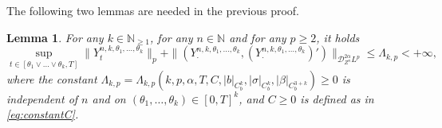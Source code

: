 \documentclass[11pt,a4paper]{article}
\theoremstyle{plain}
\newtheorem{lemma}[defn]{Lemma}
\begin{document}
The following two lemmas are needed in the previous proof. 

\begin{lemma}\label{lemma:aprioriboundsinthesmoothcase}
     For any $k \in \mathbb{N}_{\ge 1}$, for any $n\in \mathbb{N}$ and for any $p \ge 2$, it holds \begin{equation*}
         \sup_{t \in [\theta_1 \vee \ldots \vee \theta_k, T]} \|Y_t^{n,k, \theta_1,\ldots, \theta_k} {\|_p}  +\| (Y_{\cdot}^{n,k, \theta_1, \ldots,\theta_k}, (Y_{\cdot}^{n,k, \theta_1, \ldots, \theta_k})') \|_{\mathcal{D}_{Z^n}^{2 \alpha} L^p} \le \Lambda_{k, p}  < + \infty,
     \end{equation*}
  where the constant $\Lambda_{k, p} = \Lambda_{k, p} (k, p, \alpha, T, C, | b |_{C^k_b}, | \sigma |_{C^k_b}, | \beta |_{C^{3 + k}_b})
  \ge 0$ is independent of $n$ and on $(\theta_1, \dots, \theta_k) \in [0, T]^k$, and $C\ge0$ is defined as in \eqref{eq:constantC}.   
\end{lemma}
\end{document}
